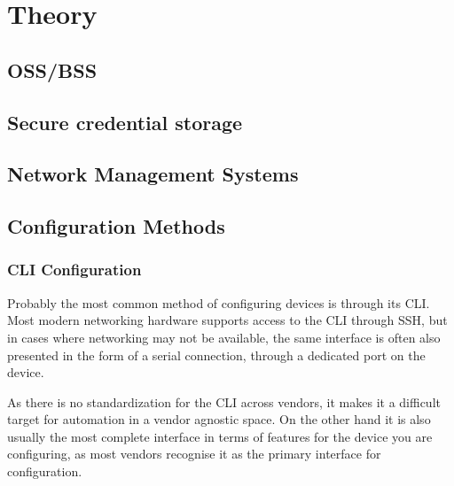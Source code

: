 \chapter{\label{theory}Theory}
\thispagestyle{fancy}


\section{OSS/BSS}



\section{Secure credential storage}




\section{Network Management Systems}


\section{Configuration Methods}

\subsection{CLI Configuration}

Probably the most common method of configuring devices is through its \acrlong{CLI}. 
Most modern networking hardware supports access to the \acrshort{CLI} through SSH,
but in cases where networking may not be available, the same interface is often also
presented in the form of a serial connection, through a dedicated port on the device.

As there is no standardization for the \acrshort{CLI} across vendors, it makes it a
difficult target for automation in a vendor agnostic space. On the other hand it
is also usually the most complete interface in terms of features for the device
you are configuring, as most vendors recognise it as the primary interface for configuration\cite{noauthor_configuration_nodate}.

